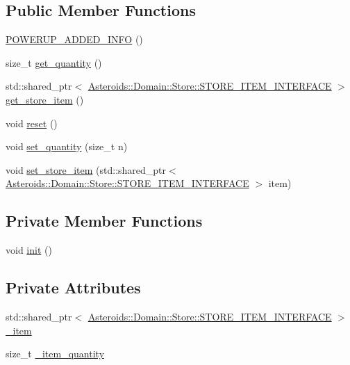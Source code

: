 \subsection*{Public Member Functions}
\begin{DoxyCompactItemize}
\item 
\hyperlink{classAsteroids_1_1Domain_1_1Store_1_1POWERUP__ADDED__INFO_ac735fa85a1732bfc02f7f7534379f306}{P\+O\+W\+E\+R\+U\+P\+\_\+\+A\+D\+D\+E\+D\+\_\+\+I\+N\+FO} ()
\item 
size\+\_\+t \hyperlink{classAsteroids_1_1Domain_1_1Store_1_1POWERUP__ADDED__INFO_acfac7542a9bebdcb877889f489c057c4}{get\+\_\+quantity} ()
\item 
std\+::shared\+\_\+ptr$<$ \hyperlink{classAsteroids_1_1Domain_1_1Store_1_1STORE__ITEM__INTERFACE}{Asteroids\+::\+Domain\+::\+Store\+::\+S\+T\+O\+R\+E\+\_\+\+I\+T\+E\+M\+\_\+\+I\+N\+T\+E\+R\+F\+A\+CE} $>$ \hyperlink{classAsteroids_1_1Domain_1_1Store_1_1POWERUP__ADDED__INFO_aca539ed99118ef33d21e14a9b973c87d}{get\+\_\+store\+\_\+item} ()
\item 
void \hyperlink{classAsteroids_1_1Domain_1_1Store_1_1POWERUP__ADDED__INFO_ae972bd3da19ae2dfea1230920b0aafc4}{reset} ()
\item 
void \hyperlink{classAsteroids_1_1Domain_1_1Store_1_1POWERUP__ADDED__INFO_afe8099b9e4266e1dd30e9d2908c17381}{set\+\_\+quantity} (size\+\_\+t n)
\item 
void \hyperlink{classAsteroids_1_1Domain_1_1Store_1_1POWERUP__ADDED__INFO_ad2b9413bde9663792a39c4bff9503ecf}{set\+\_\+store\+\_\+item} (std\+::shared\+\_\+ptr$<$ \hyperlink{classAsteroids_1_1Domain_1_1Store_1_1STORE__ITEM__INTERFACE}{Asteroids\+::\+Domain\+::\+Store\+::\+S\+T\+O\+R\+E\+\_\+\+I\+T\+E\+M\+\_\+\+I\+N\+T\+E\+R\+F\+A\+CE} $>$ item)
\end{DoxyCompactItemize}
\subsection*{Private Member Functions}
\begin{DoxyCompactItemize}
\item 
void \hyperlink{classAsteroids_1_1Domain_1_1Store_1_1POWERUP__ADDED__INFO_ae3ef91a132b9a5f545d11630ef2466d4}{init} ()
\end{DoxyCompactItemize}
\subsection*{Private Attributes}
\begin{DoxyCompactItemize}
\item 
std\+::shared\+\_\+ptr$<$ \hyperlink{classAsteroids_1_1Domain_1_1Store_1_1STORE__ITEM__INTERFACE}{Asteroids\+::\+Domain\+::\+Store\+::\+S\+T\+O\+R\+E\+\_\+\+I\+T\+E\+M\+\_\+\+I\+N\+T\+E\+R\+F\+A\+CE} $>$ \hyperlink{classAsteroids_1_1Domain_1_1Store_1_1POWERUP__ADDED__INFO_a9d7e70639f3e3c6d9eaa7f4761379a57}{\+\_\+item}
\item 
size\+\_\+t \hyperlink{classAsteroids_1_1Domain_1_1Store_1_1POWERUP__ADDED__INFO_a76cd5ea9b99621995004662ebd179b68}{\+\_\+item\+\_\+quantity}
\end{DoxyCompactItemize}


